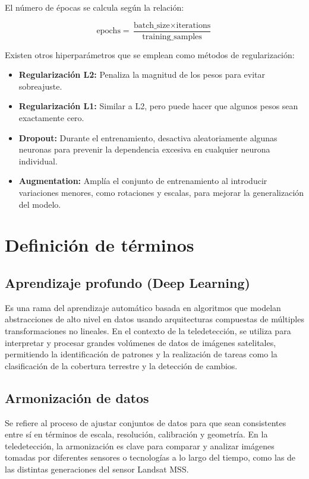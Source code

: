                     El número de épocas se calcula según la relación:
                    
                    \begin{equation}
                        \text{epochs} = \frac{\text{batch\_size} \times \text{iterations}}{\text{training\_samples}}
                    \end{equation}
                    
                    Existen otros hiperparámetros que se emplean como métodos de regularización:
                    
                    \begin{itemize}
                        \item[-] \textbf{Regularización L2:} Penaliza la magnitud de los pesos para evitar sobreajuste.
                        \item[-] \textbf{Regularización L1:} Similar a L2, pero puede hacer que algunos pesos sean exactamente cero.
                        \item[-] \textbf{Dropout:} Durante el entrenamiento, desactiva aleatoriamente algunas neuronas para prevenir la dependencia excesiva en cualquier neurona individual.
                        \item[-] \textbf{Augmentation:} Amplía el conjunto de entrenamiento al introducir variaciones menores, como rotaciones y escalas, para mejorar la generalización del modelo.
                    \end{itemize}
        \section{Definición de términos}
            \subsection{Aprendizaje profundo (Deep Learning)}
                Es una rama del aprendizaje automático basada en algoritmos que modelan abstracciones de alto nivel en datos usando arquitecturas compuestas de múltiples transformaciones no lineales. En el contexto de la teledetección, se utiliza para interpretar y procesar grandes volúmenes de datos de imágenes satelitales, permitiendo la identificación de patrones y la realización de tareas como la clasificación de la cobertura terrestre y la detección de cambios.
                
            \subsection{Armonización de datos}
                Se refiere al proceso de ajustar conjuntos de datos para que sean consistentes entre sí en términos de escala, resolución, calibración y geometría. En la teledetección, la armonización es clave para comparar y analizar imágenes tomadas por diferentes sensores o tecnologías a lo largo del tiempo, como las de las distintas generaciones del sensor Landsat MSS.
                
